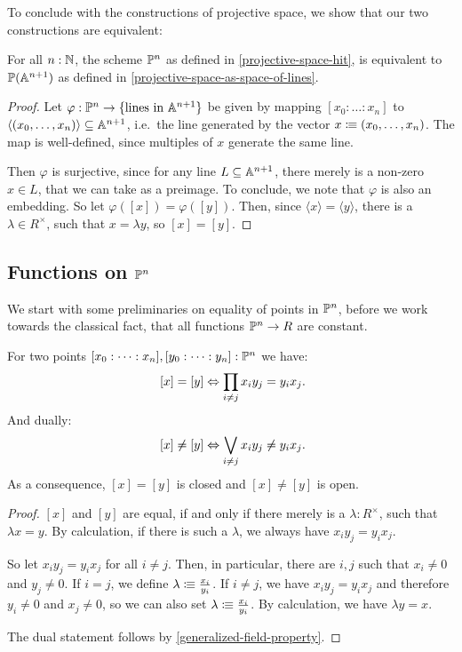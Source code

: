 To conclude with the constructions of projective space,
we show that our two constructions are equivalent:

\begin{proposition}
  \label{space-of-lines-is-projective-space}
  For all $n:\mathbb{N}$, the scheme $\mathbb{P}^n$ as defined in \cref{projective-space-hit},
  is equivalent to $\mathbb{P}(\mathbb{A}^{n+1})$ as defined in \cref{projective-space-as-space-of-lines}.
\end{proposition}

\begin{proof}
  Let $\varphi:\mathbb{P}^n\to \{\text{lines in $\mathbb{A}^{n+1}$}\}$
  be given by mapping $[x_0:\dots:x_n]$ to $\langle (x_0,\dots,x_n)\rangle\subseteq \mathbb{A}^{n+1}$,
  i.e.\ the line generated by the vector $x\vcentcolon\mspace{-1.2mu}\equiv (x_0,\dots,x_n)$.
  The map is well-defined, since multiples of $x$ generate the same line.

  Then $\varphi$ is surjective,
  since for any line $L\subseteq \mathbb{A}^{n+1}$,
  there merely is a non-zero $x\in L$,
  that we can take as a preimage.
  To conclude, we note that $\varphi$ is also an embedding.
  So let $\varphi([x])=\varphi([y])$.
  Then, since $\langle x\rangle=\langle y\rangle$, there is a $\lambda\in R^\times$,
  such that $x=\lambda y$, so $[x]=[y]$.
\end{proof}

\subsection{Functions on $\mathbb{P}^n$}

We start with some preliminaries on equality of points in $\mathbb{P}^n$,
before we work towards the classical fact, that all functions $\mathbb{P}^n\to R$ are constant.

\begin{lemma}
  \label{equality-2-by-2-minor}
  For two points $[x_0:\dots:x_n],[y_0:\dots:y_n]:\mathbb{P}^n$ we have:
  \[
    [x]=[y] \Leftrightarrow \prod_{i\neq j}x_iy_j=y_ix_j
    \rlap{.}
  \]
  And dually:
  \[
    [x]\neq [y] \Leftrightarrow \bigvee_{i\neq j}x_iy_j\neq y_ix_j
    \rlap{.}
  \]
  As a consequence, $[x]=[y]$ is closed and $[x]\neq [y]$ is open.
\end{lemma}

\begin{proof}
  $[x]$ and $[y]$ are equal,
  if and only if there merely is a $\lambda:R^\times$,
  such that $\lambda x = y$.
  By calculation, if there is such a $\lambda$,
  we always have $x_iy_j=y_ix_j$.

  So let $x_iy_j=y_ix_j$ for all $i\neq j$.
  Then, in particular, there are $i,j$ such that $x_i\neq 0$ and $y_j\neq 0$.
  If $i=j$, we define $\lambda \vcentcolon\mspace{-1.2mu}\equiv \frac{x_i}{y_i}$.
  If $i\neq j$, we have $x_iy_j=y_ix_j$ and therefore $y_i\neq 0$ and $x_j\neq 0$,
  so we can also set $\lambda \vcentcolon\mspace{-1.2mu}\equiv \frac{x_i}{y_i}$.
  By calculation, we have $\lambda y=x$.

  The dual statement follows by \cref{generalized-field-property}.
\end{proof}

